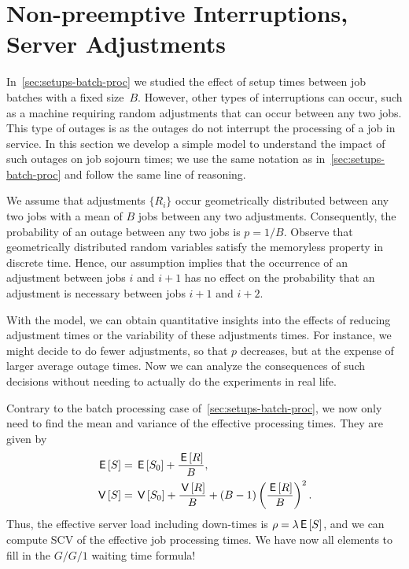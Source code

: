 \section{Non-preemptive Interruptions, Server Adjustments}
\label{sec:non-preempt-interr}





In~\cref{sec:setups-batch-proc} we studied the effect of setup times between job batches with a fixed size~$B$.
However, other types of interruptions can occur, such as a machine requiring random adjustments that can occur between any two jobs.
This type of outages is  as the outages do not interrupt the processing of a job in service.
In this section we develop a simple model to understand the impact of such outages on job sojourn times; we use the same notation as in~\cref{sec:setups-batch-proc} and follow the same line of reasoning.

We assume that adjustments $\{R_i\}$ occur geometrically distributed between any two jobs with a mean of $B$ jobs between any two adjustments.
Consequently, the probability of an outage between any two jobs is $p=1/B$.
Observe that geometrically distributed random variables satisfy the memoryless property in discrete time.
Hence, our assumption implies that the occurrence of an adjustment between jobs $i$ and $i+1$ has no effect on the probability that an adjustment is necessary between jobs $i+1$ and $i+2$.

With the model, we can obtain quantitative insights into the effects of reducing adjustment times or the variability of these adjustments times.
For instance, we might decide to do fewer adjustments, so that $p$ decreases, but at the expense of larger average outage times.
Now we can analyze the consequences of such decisions without needing to actually do the experiments in real life. 

Contrary to the batch processing case of~\cref{sec:setups-batch-proc}, we now only need to find the mean and variance of the effective processing times. They are given by
\begin{align}
 \,\mathsf{E}\left[S\right] &= \,\mathsf{E}\left[S_0\right] + \frac{\,\mathsf{E}\left[R\right]}B, \label{eq:88}\\
 \,\mathsf{V}\left[S\right] &= \,\mathsf{V}\left[S_0\right] + \frac{\,\mathsf{V}\left[R\right]} B + (B-1)\left(\frac{\,\mathsf{E}\left[R\right]}{B}\right)^2.\label{eq:89} 
\end{align}
Thus, the effective server load including down-times is $\rho = \lambda \,\mathsf{E}\left[S\right]$, and we can compute SCV of the effective job processing times.
We have now all elements to fill in the $G/G/1$ waiting time formula!




